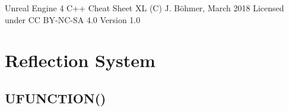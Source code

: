 \documentclass[10pt,a4paper]{article}
\begin{document}
\begin{multicols*}{2}
	
	\begin{center}
		\Huge{Unreal Engine 4 C++ Cheat Sheet XL}
		\linebreak
		\Large{(C) J. Böhmer, March 2018  \linebreak Licensed under CC BY-NC-SA 4.0}
		\linebreak
		\Large{Version 1.0}
	\end{center}
	
	\section{Reflection System}
	
	\subsection{UFUNCTION()}
	
	\begin{tabularx}{\columnwidth}{|p{4.1cm}|X|}
		

\end{tabularx}
\end{multicols*}
\end{document}
